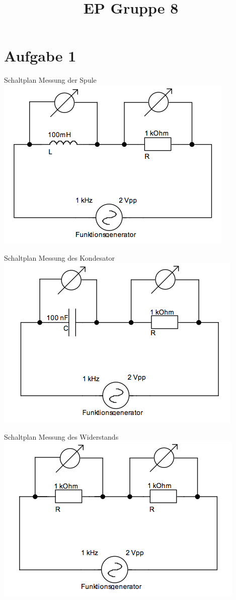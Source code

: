 \documentclass[compress,11pt]{beamer}
\title{EP Gruppe 8}
\begin{document}
\frame[c]{\titlepage}
\begin{frame}
\tableofcontents
\end{frame}

\section{Aufgabe 1}
\begin{frame}
\begin{block}{Schaltplan Messung der Spule}
\includegraphics[width=.7\textwidth]{../daten/Messdaten/plots/spule}
\end{block}
\end{frame}

\begin{frame}
\begin{block}{Schaltplan Messung des Kondesator}
\includegraphics[width=.7\textwidth]{../daten/Messdaten/plots/kondensator}
\end{block}
\end{frame}

\begin{frame}
\begin{block}{Schaltplan Messung des Widerstands}
\includegraphics[width=.7\textwidth]{../daten/Messdaten/plots/widerstand}
\end{block}
\end{frame}
\end{document}
